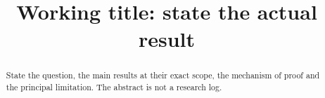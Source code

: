 \documentclass[11pt,reqno]{amsart}
\title[Short running title]{Working title: state the actual result}
\date{}
\begin{document}
\begin{abstract}
State the question, the main results at their exact scope, the mechanism of
proof and the principal limitation. The abstract is not a research log.
\end{abstract}
\maketitle
\tableofcontents




\appendix


\end{document}
